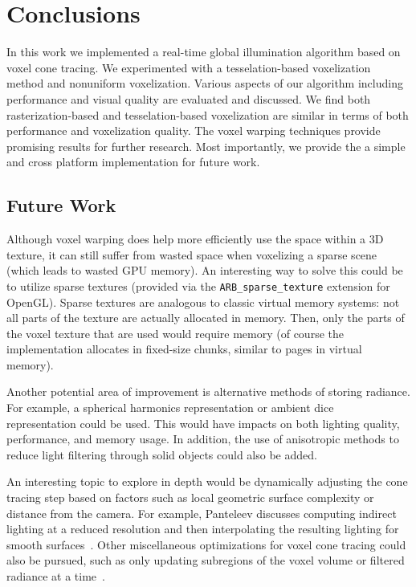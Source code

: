 \chapter{Conclusions}

In this work we implemented a real-time global illumination algorithm based on voxel cone tracing. We experimented with a tesselation-based voxelization method and nonuniform voxelization. Various aspects of our algorithm including performance and visual quality are evaluated and discussed. We find both rasterization-based and tesselation-based voxelization are similar in terms of both performance and voxelization quality. The voxel warping techniques provide promising results for further research. Most importantly, we provide the a simple and cross platform implementation for future work.

\section{Future Work}
Although voxel warping does help more efficiently use the space within a 3D texture, it can still suffer from wasted space when voxelizing a sparse scene (which leads to wasted GPU memory). An interesting way to solve this could be to utilize sparse textures (provided via the \verb#ARB_sparse_texture# extension for OpenGL). Sparse textures are analogous to classic virtual memory systems: not all parts of the texture are actually allocated in memory. Then, only the parts of the voxel texture that are used would require memory (of course the implementation allocates in fixed-size chunks, similar to pages in virtual memory).

Another potential area of improvement is alternative methods of storing radiance. For example, a spherical harmonics representation or ambient dice~\cite{iwanicki2017ambient} representation could be used. This would have impacts on both lighting quality, performance, and memory usage. In addition, the use of anisotropic methods to reduce light filtering through solid objects could also be added.

An interesting topic to explore in depth would be dynamically adjusting the cone tracing step based on factors such as local geometric surface complexity or distance from the camera. For example, Panteleev discusses computing indirect lighting at a reduced resolution and then interpolating the resulting lighting for smooth surfaces~\cite{practicalvxgi}. Other miscellaneous optimizations for voxel cone tracing could also be pursued, such as only updating subregions of the voxel volume or filtered radiance at a time~\cite{mclaren2016cascaded}.



